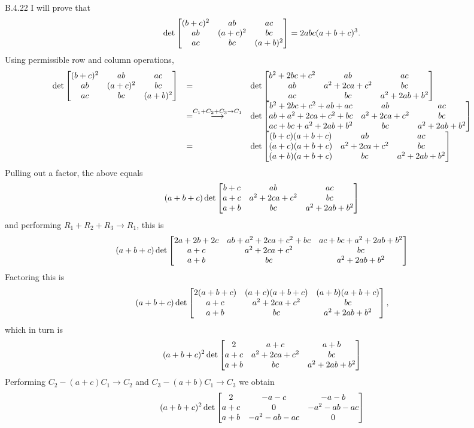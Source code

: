 \begin{Answer}{B.4.22}
I will prove that
$$\det \begin{bmatrix}  (b+c)^2 &  ab & ac \cr
ab & (a+c)^2 & bc\cr ac & bc & (a+b)^2 \cr
\end{bmatrix} = 2abc(a+b+c)^3. $$
Using permissible row and column operations,
$$\begin{array}{lll}
\det \begin{bmatrix}  (b+c)^2 &  ab & ac \cr ab & (a+c)^2 & bc\cr ac
& bc & (a+b)^2 \cr
\end{bmatrix} & = & \det \begin{bmatrix}  b^2+2bc+c^2 &  ab & ac \cr ab & a^2+2ca+c^2 & bc\cr ac
& bc & a^2+2ab+b^2 \cr
\end{bmatrix}\\
& = \grstep{C_1+C_2+C_3\to C_1} & \det
\begin{bmatrix} b^2+2bc+c^2+ab+ac & ab & ac \cr ab+a^2+2ca+c^2+bc & a^2+2ca+c^2 & bc\cr
ac+bc+a^2+2ab+b^2 & bc & a^2+2ab+b^2 \cr
\end{bmatrix}\\
& =  & \det
\begin{bmatrix} (b+c)(a+b+c) & ab & ac \cr (a+c)(a+b+c) & a^2+2ca+c^2 & bc\cr
(a+b)(a+b+c) & bc & a^2+2ab+b^2 \cr
\end{bmatrix}\\
\end{array}$$
Pulling out a factor, the above equals
$$
 (a+b+c)\det
\begin{bmatrix} b+c & ab & ac \cr a+c & a^2+2ca+c^2 & bc\cr
a+b & bc & a^2+2ab+b^2 \cr
\end{bmatrix}
$$ and performing $R_1+R_2+R_3\to R_1$, this is  $$ (a+b+c)\det
\begin{bmatrix} 2a+2b+2c & ab+a^2+2ca+c^2+bc & ac+bc+ a^2+2ab+b^2 \cr a+c & a^2+2ca+c^2 & bc\cr
a+b & bc & a^2+2ab+b^2 \cr
\end{bmatrix}$$
Factoring this is
$$ (a+b+c)\det
\begin{bmatrix} 2(a+b+c) & (a+c)(a+b+c) & (a+b)(a+b+c) \cr a+c & a^2+2ca+c^2 & bc\cr
a+b & bc & a^2+2ab+b^2 \cr
\end{bmatrix},$$which in turn is  $$(a+b+c)^2\det
\begin{bmatrix} 2 & a+c & a+b \cr a+c & a^2+2ca+c^2 & bc\cr
a+b & bc & a^2+2ab+b^2 \cr
\end{bmatrix}$$
Performing $C_2-(a+c)C_1\to C_2$ and $C_3-(a+b)C_1\to C_3$ we obtain
 $$(a+b+c)^2\det
\begin{bmatrix} 2 & -a-c & -a-b \cr a+c & 0 & -a^2-ab-ac\cr
a+b &-a^2- ab-ac & 0 \cr

\end{bmatrix}$$
\end{Answer}
